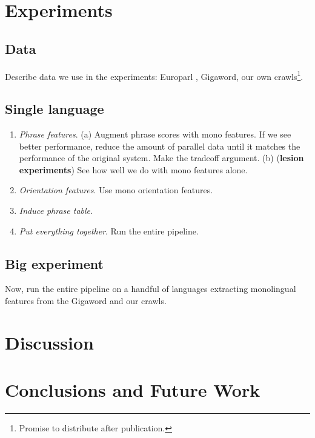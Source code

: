 \documentclass[11pt]{article}
\begin{document}
\section{Experiments} \label{sect:exp}

\subsection{Data}
Describe data we use in the experiments:  Europarl \cite{Koehn:2005}, Gigaword, our own crawls\footnote{Promise to distribute after publication.}.

\subsection{Single language}

\begin{enumerate}
\item {\em Phrase features}.  (a) Augment phrase scores with mono features.  If we see better performance, reduce the amount of parallel data until it matches the performance of the original system.  Make the tradeoff argument.  (b) ({\bf lesion experiments}) See how well we do with mono features alone.
\item {\em Orientation features}. Use mono orientation features.
\item {\em Induce phrase table}.
\item {\em Put everything together}.  Run the entire pipeline.
\end{enumerate}

\subsection{Big experiment}

Now, run the entire pipeline on a handful of languages extracting monolingual features from the Gigaword and our crawls.


\section{Discussion} \label{sect:disc}


\section{Conclusions and Future Work} \label{sect:conc}
\end{document}
